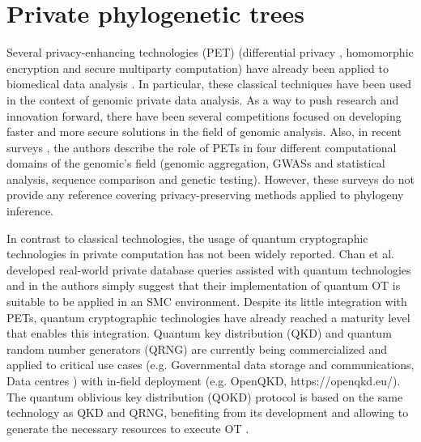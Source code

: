 


%

\chapter{Private phylogenetic trees}
\label{ch:phylogenetic-trees}

Several privacy-enhancing technologies (PET) (differential privacy \cite{Li2016}, homomorphic encryption \cite{Armknecht2015} and secure multiparty computation) have already been applied to biomedical data analysis \cite{Verhaert2018, Scardapane2017, Maulany2018, Kikuchi2018, Tawfik2018}. In particular, these classical techniques have been used in the context of genomic private data analysis. As a way to push research and innovation forward, there have been several competitions \cite{Wang2017} focused on developing faster and more secure solutions in the field of genomic analysis. Also, in recent surveys \cite{MY19, Naveed2015}, the authors describe the role of PETs in four different computational domains of the genomic's field (genomic aggregation, GWASs and statistical analysis, sequence comparison and genetic testing). However, these surveys do not provide any reference covering privacy-preserving methods applied to phylogeny inference. 

In contrast to classical technologies, the usage of quantum cryptographic technologies in private computation has not been widely reported. Chan et al. \cite{Chan2014} developed real-world private database queries assisted with quantum technologies and in \cite{Ito2017} the authors simply suggest that their implementation of quantum OT is suitable to be applied in an SMC environment. %
Despite its little integration with PETs, quantum cryptographic technologies have already reached a maturity level that enables this integration. Quantum key distribution (QKD) and quantum random number generators (QRNG) are currently being commercialized and applied to critical use cases (e.g. Governmental data storage and communications, Data centres \cite{AM19}) with in-field deployment (e.g. OpenQKD, https://openqkd.eu/). The quantum oblivious key distribution (QOKD) protocol is based on the same technology as QKD and QRNG, benefiting from its development and allowing to generate the necessary resources to execute OT \cite{Lemus20, JSGBBWZ11, KWW12}. 

